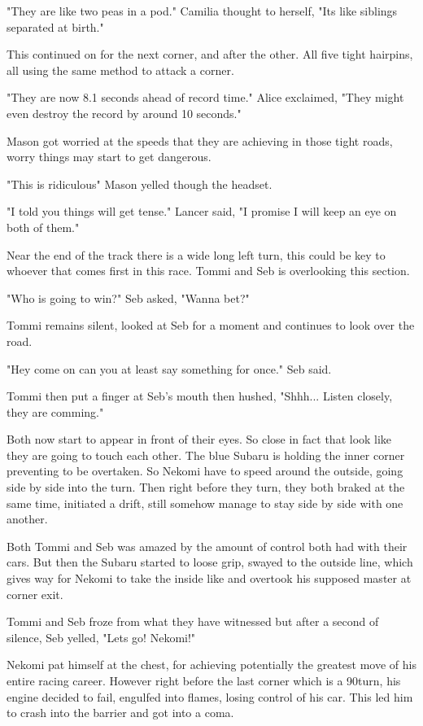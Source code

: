 "They are like two peas in a pod." Camilia thought to herself, "Its like siblings separated at birth."

This continued on for the next corner, and after the other. All five tight hairpins, all using the same method to attack a corner.

"They are now 8.1 seconds ahead of record time." Alice exclaimed, "They might even destroy the record by around 10 seconds."

Mason got worried at the speeds that they are achieving in those tight roads, worry things may start to get dangerous.

"This is ridiculous" Mason yelled though the headset.

"I told you things will get tense." Lancer said, "I promise I will keep an eye on both of them."

Near the end of the track there is a wide long left turn, this could be key to whoever that comes first in this race. Tommi and Seb is overlooking this section.

"Who is going to win?" Seb asked, "Wanna bet?"

Tommi remains silent, looked at Seb for a moment and continues to look over the road.

"Hey come on can you at least say something for once." Seb said.

Tommi then put a finger at Seb's mouth then hushed, "Shhh... Listen closely, they are comming."

Both now start to appear in front of their eyes. 
So close in fact that look like they are going to touch each other. 
The blue Subaru is holding the inner corner preventing to be overtaken. 
So Nekomi have to speed around the outside, going side by side into the turn. 
Then right before they turn, they both braked at the same time, initiated a drift, still somehow manage to stay side by side with one another.

Both Tommi and Seb was amazed by the amount of control both had with their cars. 
But then the Subaru started to loose grip, swayed to the outside line, which gives way for Nekomi to take the inside like and overtook his supposed master at corner exit.

Tommi and Seb froze from what they have witnessed but after a second of silence, Seb yelled, "Lets go! Nekomi!"

Nekomi pat himself at the chest, for achieving potentially the greatest move of his entire racing career. 
However right before the last corner which is a 90\textdegree turn, his engine decided to fail, engulfed into flames, losing control of his car. This led him to crash into the barrier and got into a coma.

